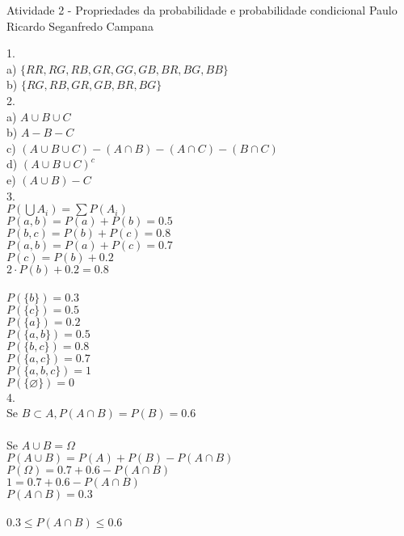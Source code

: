 \documentclass[12pt]{article}
\begin{document}
	\pagestyle{empty}
	\begin{center}
		Atividade 2 - Propriedades da probabilidade e probabilidade condicional
		Paulo Ricardo Seganfredo Campana\\
	\end{center}
	
1.\\
a) $\lbrace RR, RG, RB, GR, GG, GB, BR, BG, BB \rbrace$\\
b) $\lbrace RG, RB, GR, GB, BR, BG \rbrace$\\

2.\\
a) $ A \cup B \cup C$\\
b) $ A - B - C$\\
c) $(A \cup B \cup C) - (A \cap B) - (A \cap C) - (B \cap C)$\\
d) $(A \cup B \cup C)^{c}$\\
e) $(A \cup B) - C$\\

3.\\
$P(\bigcup A_{i}) = \sum P(A_{i})$\\
$P(a, b) = P(a) + P(b) = 0.5$\\
$P(b, c) = P(b) + P(c) = 0.8$\\
$P(a, b) = P(a) + P(c) = 0.7$\\
$P(c) = P(b) + 0.2$\\
$2 \cdot P(b) + 0.2 = 0.8$\\\\
$P(\lbrace b \rbrace) = 0.3$\\
$P(\lbrace c \rbrace) = 0.5$\\
$P(\lbrace a \rbrace) = 0.2$\\ 
$P(\lbrace a, b \rbrace) = 0.5$\\ 
$P(\lbrace b, c \rbrace) = 0.8$\\ 
$P(\lbrace a, c \rbrace) = 0.7$\\
$P(\lbrace a, b, c \rbrace) = 1$\\  
$P(\lbrace \varnothing \rbrace) = 0$\\ 

4.\\
Se $B \subset A, P(A \cap B) = P(B) = 0.6$\\\\
Se $A \cup B = \Omega$\\
$P(A \cup B) = P(A) + P(B) - P(A \cap B)$\\
$P(\Omega) = 0.7 + 0.6 - P(A \cap B)$\\
$1 = 0.7 + 0.6 - P(A \cap B)$\\
$P(A \cap B) = 0.3$\\\\
$0.3 \leq P(A \cap B) \leq 0.6$\\
\end{document}
